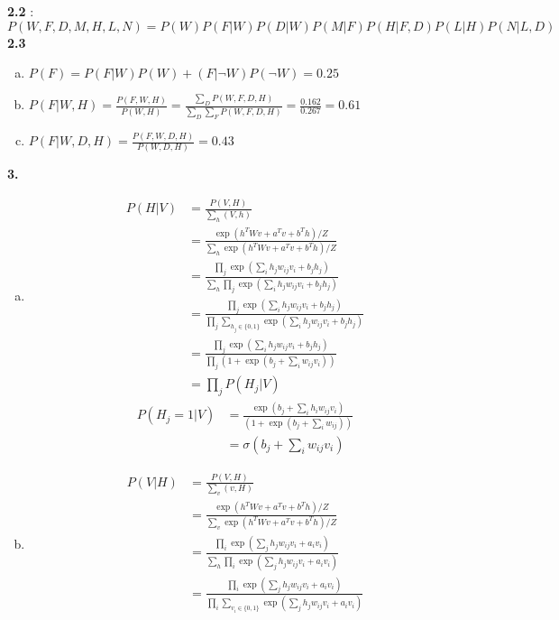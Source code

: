 \documentclass{article}
\begin{document}
\textbf{2.2} : $P(W, F, D, M, H, L, N) = P(W)P(F|W)P(D|W)P(M|F)P(H|F,D)P(L|H)P(N|L,D)$ \\[1.5ex]
\textbf{2.3} \begin{enumerate}[(a)]
    \item $P(F) = P(F|W)P(W) + (F|\neg W)P(\neg W) = 0.25$
    \item $P(F|W, H) = \frac{P(F, W, H)}{P(W, H)} = \frac{\sum_D P(W, F, D, H)}{\sum_D \sum_F P(W, F, D, H)} = \frac{0.162}{0.267} = 0.61$
    \item $P(F|W, D, H) = \frac{P(F, W, D, H)}{P(W, D, H)} = 0.43$
\end{enumerate}
\textbf{3.} \begin{enumerate}[(a)]
    \item \begin{align*}
        P(H | V) &= \frac{P(V, H)}{\sum_h (V, h)} \\
        &= \frac{\exp(h^TWv + a^Tv + b^Th)/Z}{\sum_h \exp(h^TWv + a^Tv + b^Th)/Z} \\[0.5ex]
        &= \frac{\prod_j \exp(\sum_i h_j w_{ij}v_i + b_jh_j)}{\sum_{h} \prod_j \exp(\sum_i h_j w_{ij}v_i + b_jh_j)} \\[0.5ex]
        &= \frac{\prod_j \exp(\sum_i h_j w_{ij}v_i + b_jh_j)}{\prod_j \sum_{h_j \in \{0, 1\}}\exp(\sum_i h_j w_{ij}v_i + b_jh_j)} \\[0.5ex]
        &= \frac{\prod_j \exp(\sum_i h_j w_{ij}v_i + b_jh_j)}{\prod_j (1 + \exp(b_j + \sum_i w_{ij}v_i))} \\[0.5ex]
        &= \prod_j P(H_j | V)
    \end{align*}
    \begin{align*}
        P(H_j = 1 | V) &= \frac{\exp( b_j + \sum_i h_i w_{ij}v_i)}{(1 + \exp(b_j + \sum_i w_{ij}))} \\[0.5ex]
        &= \sigma(b_j + \sum_{i} w_{ij}v_i)
    \end{align*}
    \item \begin{align*}
        P(V | H) &= \frac{P(V, H)}{\sum_v (v, H)} \\
        &= \frac{\exp(h^TWv + a^Tv + b^Th)/Z}{\sum_v \exp(h^TWv + a^Tv + b^Th)/Z} \\[0.5ex]
        &= \frac{\prod_i \exp(\sum_j h_j w_{ij}v_i + a_iv_i)}{\sum_{h} \prod_i \exp(\sum_j h_j w_{ij}v_i + a_iv_i)} \\[0.5ex]
        &= \frac{\prod_i \exp(\sum_j h_j w_{ij}v_i + a_iv_i)}{\prod_i \sum_{v_i \in \{0, 1\}}\exp(\sum_j h_j w_{ij}v_i + a_iv_i)} \\[0.5ex]

\end{align*}
\end{enumerate}
\end{document}
